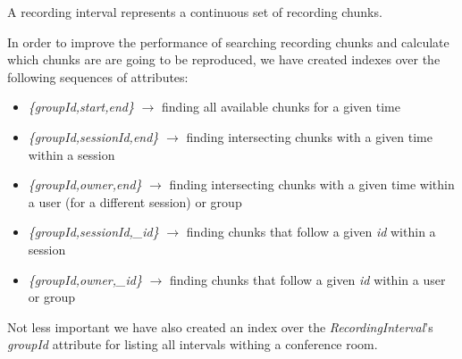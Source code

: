 A recording interval represents a continuous set of recording chunks.

In order to improve the performance of searching recording chunks and calculate which chunks are are going to be reproduced, we have created indexes over the following sequences of attributes: 
\begin{itemize}
    \item{\emph{\{groupId,start,end\}} $\rightarrow$ finding all available chunks for a given time} 
    \item{\emph{\{groupId,sessionId,end\}} $\rightarrow$ finding intersecting chunks with a given time within a session}
    \item{\emph{\{groupId,owner,end\}} $\rightarrow$ finding intersecting chunks with a given time within a user (for a different session) or group}
    \item{\emph{\{groupId,sessionId,\_id\}} $\rightarrow$ finding chunks that follow a given \emph{id} within a session}
    \item{\emph{\{groupId,owner,\_id\}} $\rightarrow$ finding chunks that follow a given \emph{id} within a user or group}
\end{itemize}

Not less important we have also created an index over the \emph{RecordingInterval}'s \emph{groupId} attribute for listing all intervals withing a conference room. 
